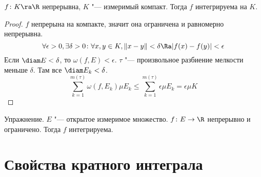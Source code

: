 \begin{theorem}
	$f\colon K \ra \R$ непрерывна, $K$ "--- измеримый компакт.
	Тогда $f$ интегрируема на $K$.
\end{theorem}
\begin{proof}
	$f$ непрерына на компакте, значит она ограничена и равномерно непрерывна.
	\[ \forall \epsilon > 0, \exists \delta > 0\colon \forall x,y\in K, \|x - y\| < \delta \Ra |f(x) - f(y)| < \epsilon \]
	Если $\diam E < \delta$, то $\omega(f, E) < \epsilon$.
	$\tau$ "--- произвольное разбиение мелкости меньше $\delta$. Там все $\diam E_k < \delta$.
	\[ \sum_{k=1}^{m(\tau)} \omega(f, E_k) \mu E_k \le \sum_{k=1}^{m(\tau)} \epsilon \mu E_k = \epsilon \mu K \]
\end{proof}

Упражнение. $E$ "--- открытое измеримое множество.
$f\colon E \to \R$ непрерывно и ограничено.
Тогда $f$ интегрируема.

\section{Свойства кратного интеграла}

